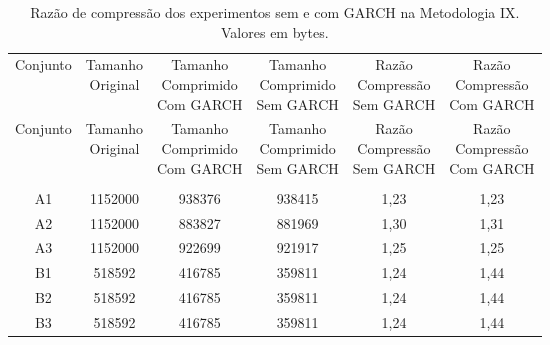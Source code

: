 \begin{center}
\begin{longtable}{cccccc}
\toprule
\rowcolor{white}
\caption[Metodologia IX: Razão de compressão]{Razão de compressão dos
experimentos sem e com GARCH na Metodologia IX.
Valores em bytes.} \label{Tab:razaocompressaoMet} \\
\midrule
Conjunto & \specialcell{Tamanho \\Original} & \specialcell{Tamanho
\\Comprimido\\Com GARCH} & \specialcell{Tamanho
\\Comprimido\\Sem GARCH} & \specialcell{Razão \\Compressão
\\Sem GARCH} & \specialcell{Razão \\Compressão
\\Com GARCH} \\
\midrule
\endfirsthead
\midrule
\rowcolor{white}
Conjunto & \specialcell{Tamanho \\Original} & \specialcell{Tamanho
\\Comprimido\\Com GARCH} & \specialcell{Tamanho
\\Comprimido\\Sem GARCH} & \specialcell{Razão \\Compressão
\\Sem GARCH} & \specialcell{Razão \\Compressão
\\Com GARCH} \\
\toprule
\endhead
\midrule \\ %
\endfoot
\bottomrule
\endlastfoot
    A1    & 1152000 & 938376 & 938415 & 1,23  & 1,23 \\
    A2    & 1152000 & 883827 & 881969 & 1,30  & 1,31 \\
    A3    & 1152000 & 922699 & 921917 & 1,25  & 1,25 \\
    B1    & 518592 & 416785 & 359811 & 1,24  & 1,44 \\
    B2    & 518592 & 416785 & 359811 & 1,24  & 1,44 \\
    B3    & 518592 & 416785 & 359811 & 1,24  & 1,44 \\

\end{longtable}
\end{center}
